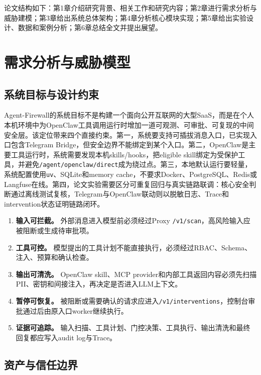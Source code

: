\documentclass[UTF8,zihao=-4,scheme=chinese,fontset=none]{ctexart}
\newcommand{\code}[1]{{\ttfamily\small\nolinkurl{#1}}}
\begin{document}
论文结构如下：第1章介绍研究背景、相关工作和研究内容；第2章进行需求分析与威胁建模；第3章给出系统总体架构；第4章分析核心模块实现；第5章给出实验设计、数据和案例分析；第6章总结全文并提出展望。

\section{需求分析与威胁模型}

\subsection{系统目标与设计约束}

Agent-Firewall的系统目标不是构建一个面向公开互联网的大型SaaS，而是在个人本机环境中为OpenClaw工具调用运行时增加一道可观测、可审批、可复现的中间安全层。该定位带来四个直接约束。第一，系统要支持可插拔消息入口，已实现入口包含Telegram Bridge，但安全边界不能绑定到某个入口。第二，OpenClaw是主要工具运行时，系统需要发现本机skills/hooks，把eligible skill绑定为受保护工具，并避免\code{/agent/openclaw/direct}成为绕过点。第三，本地默认运行要轻量，系统配置使用\code{uv}、SQLite和memory cache，不要求Docker、PostgreSQL、Redis或Langfuse在线。第四，论文实验需要区分可重复回归与真实链路联调：核心安全判断通过离线测试复核，Telegram与OpenClaw联动则以脱敏日志、Trace和intervention状态证明链路闭环。

\begin{enumerate}[label=（\arabic*）]
  \item \textbf{输入可拦截。} 外部消息进入模型前必须经过Proxy \code{/v1/scan}，高风险输入应被阻断或生成待审批项。
  \item \textbf{工具可控。} 模型提出的工具计划不能直接执行，必须经过RBAC、Schema、注入、预算和确认检查。
  \item \textbf{输出可清洗。} OpenClaw skill、MCP provider和内部工具返回内容必须先扫描PII、密钥和间接注入，再决定是否进入LLM上下文。
  \item \textbf{暂停可恢复。} 被阻断或需要确认的请求应进入\code{/v1/interventions}，控制台审批通过后由原入口worker继续执行。
  \item \textbf{证据可追踪。} 输入扫描、工具计划、门控决策、工具执行、输出清洗和最终回复都应写入audit log与Trace。
\end{enumerate}

\subsection{资产与信任边界}
\end{document}
